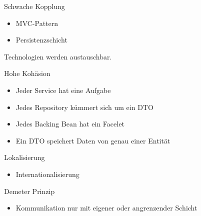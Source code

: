 \documentclass{beamer}
\begin{document}
    \begin{frame}{Schwache Kopplung}
        \begin{itemize}
            \item MVC-Pattern \pause
            \item Persistenzschicht
        \end{itemize}
        Technologien werden austauschbar.
    \end{frame}

    \begin{frame}{Hohe Kohäsion}
        \begin{itemize}
            \item Jeder Service hat eine Aufgabe
            \pause
            \item Jedes Repository kümmert sich um ein DTO
            \pause
            \item Jedes Backing Bean hat ein Facelet \pause
            \item Ein DTO speichert Daten von genau einer Entität
        \end{itemize}
    \end{frame}

    \begin{frame}{Lokalisierung}
        \begin{itemize}
            \item Internationalisierung
        \end{itemize}
    \end{frame}

    \begin{frame}{Demeter Prinzip}
        \begin{itemize}
            \item Kommunikation nur mit eigener oder angrenzender Schicht
        \end{itemize}
    \end{frame}
\end{document}
